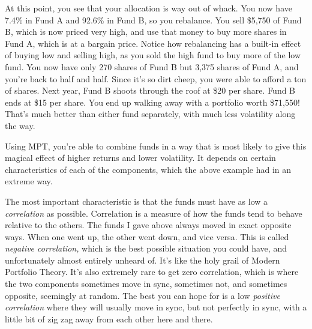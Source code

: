 At this point, you see that your allocation is way out of whack. You now have 7.4\% in Fund A and 92.6\% in Fund B, so you rebalance. You sell \$5,750 of Fund B, which is now priced very high, and use that money to buy more shares in Fund A, which is at a bargain price. Notice how rebalancing has a built-in effect of buying low and selling high, as you sold the high fund to buy more of the low fund. You now have only 270 shares of Fund B but 3,375 shares of Fund A, and you're back to half and half. Since it's so dirt cheep, you were able to afford a ton of shares. Next year, Fund B shoots through the roof at \$20 per share. Fund B ends at \$15 per share. You end up walking away with a portfolio worth \$71,550! That's much better than either fund separately, with much less volatility along the way.

\begin{figure}[htbp]
  \centering
\end{figure}

Using MPT, you're able to combine funds in a way that is most likely to give this magical effect of higher returns and lower volatility. It depends on certain characteristics of each of the components, which the above example had in an extreme way.

The most important characteristic is that the funds must have as low a \emph{correlation} as possible. Correlation is a measure of how the funds tend to behave relative to the others. The funds I gave above always moved in exact opposite ways. When one went up, the other went down, and vice versa. This is called \emph{negative correlation,} which is the best possible situation you could have, and unfortunately almost entirely unheard of. It's like the holy grail of Modern Portfolio Theory. It's also extremely rare to get zero correlation, which is where the two components sometimes move in sync, sometimes not, and sometimes opposite, seemingly at random. The best you can hope for is a low \emph{positive correlation} where they will usually move in sync, but not perfectly in sync, with a little bit of zig zag away from each other here and there.

